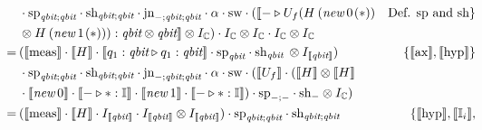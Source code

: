 \begin{align*}
  \hspace{-25pt}& \cdot \text{sp}_{\textit{qbit};\textit{qbit}} \cdot \text{sh}_{\textit{qbit};\textit{qbit}} \cdot \text{jn}_{-;\textit{qbit}; \textit{qbit}} \cdot \alpha  \cdot \text{sw}  \cdot ( \llbracket - \triangleright U_{f}(H  \hspace{2pt}  ( \textit{new}   \hspace{2pt}  0 \hspace{1pt}(*)) & \text{Def. sp and sh} \}  \\
  \hspace{-25pt}&  \otimes H  \hspace{2pt}   ( \textit{new}   \hspace{2pt}  1 \hspace{1pt}(*))) : \textit{qbit} \otimes \textit{qbit}  \rrbracket  \otimes I_{\mathbb{C}})  \cdot  I_{ \mathbb{C}} \otimes I_{\mathbb{C}} \cdot I_{\mathbb{C}} \otimes I_{\mathbb{C}}  \\
  \hspace{-25pt} =  \hspace{2pt} &  (\llbracket \text{meas} \rrbracket \cdot \llbracket H \rrbracket  \cdot \llbracket q_1:\textit{qbit} \triangleright q_1:\textit{qbit} \rrbracket \cdot \text{sp}_{\textit{qbit}} \cdot \text{sh}_{\textit{qbit}} \hspace{2pt}  \otimes I_{\llbracket \textit{qbit} \rrbracket})    &  \{\llbracket  \text{ax} \rrbracket, \llbracket  \text{hyp} \rrbracket \}  \\ 
  \hspace{-25pt} & \cdot \text{sp}_{\textit{qbit};\textit{qbit}} \cdot \text{sh}_{\textit{qbit};\textit{qbit}} \cdot \text{jn}_{-;\textit{qbit}; \textit{qbit}} \cdot \alpha \cdot \text{sw}\cdot (\llbracket U_f \rrbracket \cdot (\llbracket H \rrbracket   \otimes \llbracket H \rrbracket  \\
  \hspace{-25pt} &\cdot \llbracket  \textit{new}   \hspace{2pt}  0  \rrbracket \cdot  \llbracket - \triangleright *: \mathbb{I} \rrbracket \cdot \llbracket  \textit{new}   \hspace{2pt}  1  \rrbracket \cdot  \llbracket - \triangleright *: \mathbb{I} \rrbracket) \cdot \text{sp}_{-;-} \cdot  \text{sh}_{-} \otimes I_{\mathbb{C}})  \\
  \hspace{-25pt} =  \hspace{2pt} &   (\llbracket \text{meas} \rrbracket \cdot \llbracket H \rrbracket \cdot I_{\llbracket \textit{qbit} \rrbracket} \cdot I_{\llbracket \textit{qbit} \rrbracket}  \otimes I_{\llbracket \textit{qbit} \rrbracket} ) \cdot \text{sp}_{\textit{qbit};\textit{qbit}} \cdot \text{sh}_{\textit{qbit};\textit{qbit}}    &  \{\llbracket  \text{hyp} \rrbracket, \llbracket \mathbb{I}_i \rrbracket, \\

\end{align*}

